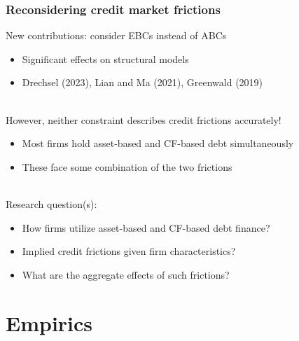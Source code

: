 \documentclass[notes]{beamer}
\begin{document}
\begin{frame}[label=slide2] \frametitle{Reconsidering credit market frictions}

New contributions: consider EBCs instead of ABCs 
\begin{itemize}  \setlength\itemsep{0em}
    \item Significant effects on structural models
    \item Drechsel (2023), Lian and Ma (2021), Greenwald (2019)
\end{itemize} \vspace{1mm} \\
However, neither constraint describes credit frictions accurately!
\begin{itemize}  \setlength\itemsep{0em}
    \item Most firms hold asset-based and CF-based debt simultaneously
    \item These face some combination of the two frictions 
\end{itemize} \vspace{1mm} \\
Research question(s): 
\begin{itemize}
 \setlength\itemsep{0em}
    \item How firms utilize asset-based and CF-based debt finance?
    \item Implied credit frictions given firm characteristics?
    \item What are the aggregate effects of such frictions?
\end{itemize}

\end{frame}

\section{Empirics}
\end{document}
